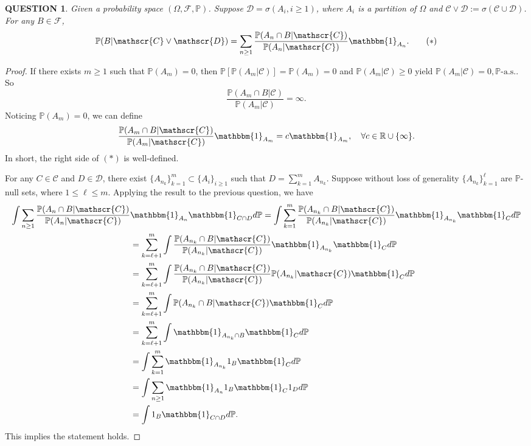 \documentclass[12pt]{article}
\renewcommand{\(}{\left(}%
\renewcommand{\)}{\right)}%
\renewcommand{\[}{\left[}%
\renewcommand{\]}{\right]}%
\renewcommand{\r}{\mathbb{R}}
\renewcommand{\ae}{\mathrm{a.s.}}
\newcommand{\p}{\mathbb{P}}
\newcommand{\f}{\mathscr{F}}
\newtheorem{question}{QUESTION}[section]}
\newtheorem{proof}{Proof.}}
\begin{document}
  \begin{question}
  	Given a probability space $(\Omega,\f,\p)$. Suppose $\mathscr{D}=\sigma(A_i,i\geq 1)$, where $A_i$ is a partition of $\Omega$ and $\mathscr{C}\vee \mathscr{D}:=\sigma(\mathscr{C}\cup \mathscr{D})$. For any $B\in\f$,
  	\begin{equation}
  		\p(B|\mathscr{C}\vee \mathscr{D})=\sum_{n\geq 1}\frac{\p(A_n\cap B|\mathscr{C})}{\p(A_n|\mathscr{C})}\mathbbm{1}_{A_n}.\tag{$*$}
  	\end{equation}
  \end{question}
  \begin{proof}
  	If there exists $m\geq 1$ such that $\p(A_m)=0$, then $\p[\p(A_m|\mathscr{C})]=\p(A_m)=0$ and $\p(A_m|\mathscr{C})\geq 0$ yield $\p(A_m|\mathscr{C})=0,\p$-$\ae$. So 
  	\begin{equation*}
  		\frac{\p(A_m\cap B|\mathscr{C})}{\p(A_m|\mathscr{C})}=\infty.
  	\end{equation*}
  	Noticing $\p(A_m)=0$, we can define
  	\begin{equation*}
  		\frac{\p(A_m\cap B|\mathscr{C})}{\p(A_m|\mathscr{C})}\mathbbm{1}_{A_m}=c\mathbbm{1}_{A_m},\quad \forall c\in \r\cup\{\infty\}.
  	\end{equation*}
  	In short, the right side of $(*)$ is well-defined.
  	
  	 For any $C\in \mathscr{C}$ and $D\in \mathscr{D}$, there exist $\{A_{n_k}\}_{k=1}^m\subset \{A_i\}_{i\geq 1}$ such that $D=\sum_{k=1}^m A_{n_k}$. Suppose without loss of generality $\{A_{n_k}\}_{k=1}^{\ell}$ are $\p$-null sets, where $1\leq\ell\leq m$. Applying the result to the previous question, we have 
  	\begin{equation*}
  		\begin{split}
  			\int \sum_{n\geq 1}\frac{\p(A_n\cap B|\mathscr{C})}{\p(A_n|\mathscr{C})}&\mathbbm{1}_{A_n} \mathbbm{1}_{C\cap D}d\p = \int \sum_{k=1}^m\frac{\p(A_{n_k}\cap B|\mathscr{C})}{\p(A_{n_k}|\mathscr{C})}\mathbbm{1}_{A_{n_k}} \mathbbm{1}_{C}d\p\\
  			&=\sum_{k=\ell+1}^m\int \frac{\p(A_{n_k}\cap B|\mathscr{C})}{\p(A_{n_k}|\mathscr{C})}\mathbbm{1}_{A_{n_k}} \mathbbm{1}_{C}d\p\\
  			&=\sum_{k=\ell+1}^m\int \frac{\p(A_{n_k}\cap B|\mathscr{C})}{\p(A_{n_k}|\mathscr{C})}\p(A_{n_k}|\mathscr{C}) \mathbbm{1}_{C}d\p\\
  			&=\sum_{k=\ell+1}^m\int \p(A_{n_k}\cap B|\mathscr{C}) \mathbbm{1}_{C}d\p\\
  			&=\sum_{k=\ell+1}^m\int \mathbbm{1}_{A_{n_k}\cap B} \mathbbm{1}_{C}d\p\\
  			&=\int \sum_{k= 1}^m\mathbbm{1}_{A_{n_k} }1_B \mathbbm{1}_{C}d\p\\
  			&=\int\sum_{n\geq 1} \mathbbm{1}_{A_n}1_B \mathbbm{1}_{C}1_Dd\p\\
  			&=\int1_B \mathbbm{1}_{C\cap D}d\p.
  		\end{split}
  	\end{equation*}
  	This implies the statement holds.
  \end{proof}
  
\end{document}
